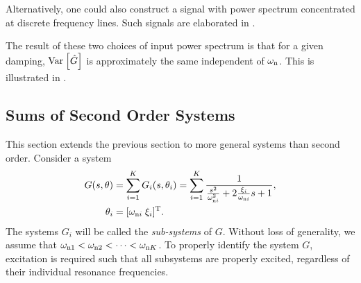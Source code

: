 Alternatively, one could also construct a signal with power spectrum concentrated at discrete frequency lines.
Such signals are elaborated in .




The result of these two choices of input power spectrum is that for a given damping, $\var{\hat{G}}$ is approximately the same independent of $\wn$. 
This is illustrated in .

\subsection{Sums of Second Order Systems}
This section extends the previous section to more general systems than second order.
Consider a system
\begin{align}
G(s,\theta) &= \sum_{i=1}^{K} G_i(s,\theta_i)
             =\sum_{i=1}^{K}  \frac{1}
                                   {   \frac{s^2}{\wn[i]^2}
                                    + 2\frac{\damping[i]}{\wn[i]}s
                                    + 1},\\
\theta_i&=[\wn[i]\;\damping[i]]^{\T}.
\label{eq:excitation:sumSys}
\end{align}
The systems  $G_i$ will be called the \emph{sub-systems} of $G$. 
Without loss of generality, we assume that $\wn[1] < \wn[2] < \cdots < \wn[K]$. 
To properly identify the system $G$, excitation is required such that all subsystems are properly excited, regardless of their individual resonance frequencies.

